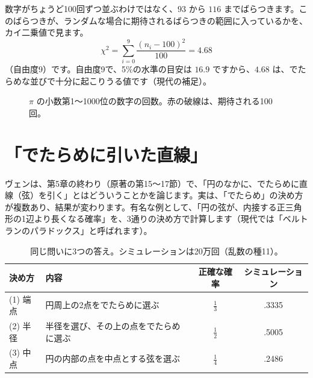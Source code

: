 \documentclass[a4paper,11pt,openany]{ltjsbook}
\begin{document}
数字がちょうど100回ずつ並ぶわけではなく、$93$ から $116$ までばらつきます。このばらつきが、ランダムな場合に期待されるばらつきの範囲に入っているかを、カイ二乗値で見ます。
\[
\chi^2=\sum_{i=0}^{9}\frac{(n_i-100)^2}{100}=4.68
\]
（自由度9）です。自由度9で、5\%の水準の目安は $16.9$ ですから、$4.68$ は、でたらめな並びで十分に起こりうる値です（現代の補足）。

\begin{figure}[htbp]
\centering
{}
\caption{$\pi$ の小数第1〜1000位の数字の回数。赤の破線は、期待される100回。}
\end{figure}

\section{「でたらめに引いた直線」}

ヴェンは、第5章の終わり（原著の第15〜17節）で、「円のなかに、でたらめに直線（弦）を引く」とはどういうことかを論じます。実は、「でたらめ」の決め方が複数あり、結果が変わります。有名な例として、「円の弦が、内接する正三角形の1辺より長くなる確率」を、3通りの決め方で計算します（現代では「ベルトランのパラドックス」と呼ばれます）。

\begin{table}[htbp]
\centering
\begin{tabular}{llcc}
\toprule
決め方 & 内容 & 正確な確率 & シミュレーション\\
\midrule
(1) 端点 & 円周上の2点をでたらめに選ぶ & $\tfrac13$ & .3335\\
(2) 半径 & 半径を選び、その上の点をでたらめに選ぶ & $\tfrac12$ & .5005\\
(3) 中点 & 円の内部の点を中点とする弦を選ぶ & $\tfrac14$ & .2486\\
\bottomrule
\end{tabular}
\caption{同じ問いに3つの答え。シミュレーションは20万回（乱数の種11）。}
\end{table}
\end{document}
